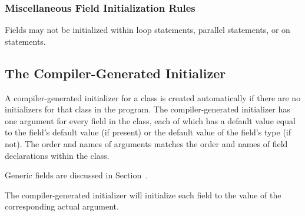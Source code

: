 \subsubsection{Miscellaneous Field Initialization Rules}

Fields may not be initialized within loop statements, parallel statements, or
on statements.

\subsection{The Compiler-Generated Initializer}
\label{The_Compiler_Generated_Initializer}

A compiler-generated initializer for a class is created automatically if there
are no initializers for that class in the program. The compiler-generated
initializer has one argument for every field in the class, each of which has a
default value equal to the field's default value (if present) or the default
value of the field's type (if not). The order and names of arguments matches
the order and names of field declarations within the class.

Generic fields are discussed in Section~.

The compiler-generated initializer will initialize each field to the value of
the corresponding actual argument.

